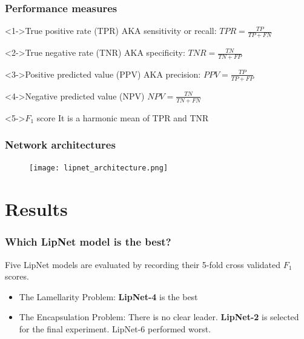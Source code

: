 \documentclass{beamer}
\begin{document}
\begin{frame}
\frametitle{Performance measures}

\begin{block}<1->{True positive rate (TPR)}
AKA sensitivity or recall: $TPR = \frac{TP}{TP + FN}$
\end{block}

\begin{block}<2->{True negative rate (TNR)}
AKA specificity: $TNR = \frac{TN}{TN + FP}$
\end{block}

\begin{block}<3->{Positive predicted value (PPV)}
AKA precision: $PPV = \frac{TP}{TP + FP}$
\end{block}

\begin{block}<4->{Negative predicted value (NPV)}
$NPV = \frac{TN}{TN + FN}$
\end{block}

\begin{block}<5->{$F_1$ score}
It is a harmonic mean of TPR and TNR
\end{block}

\end{frame}

%
%

\begin{frame}
\frametitle{Network architectures}

\begin{figure}
\centering
\texttt{[image: lipnet\_architecture.png]} 
\end{figure}

\end{frame}

\section{Results}
\begin{frame}
\frametitle{Which LipNet model is the best?}
Five LipNet models are evaluated by recording their 5-fold cross validated $F_1$ scores. 
\vskip 0.2in
\begin{itemize}
\item<2-> The Lamellarity Problem: \textbf{LipNet-4} is the best
\item<3-> The Encapsulation Problem: There is no clear leader. \textbf{LipNet-2} is selected for the final experiment. LipNet-6 performed worst. 
\end{itemize}
\end{frame}
\end{document}
